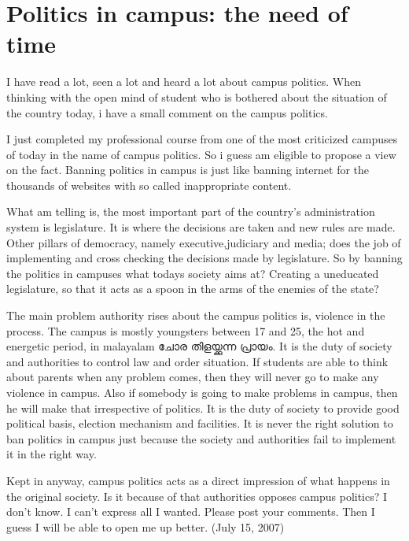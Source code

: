\section*{Politics in campus: the need of time}
\vskip 2pt
I have read a lot, seen a lot and heard a lot about campus politics. 
When thinking with the open mind of student who is bothered about 
the situation of the country today, i have a small comment on the campus politics.

I just completed my professional course from one of the most criticized campuses of 
today in the name of campus politics. So i guess am eligible to propose a view on the fact. 
Banning politics in campus is just like banning internet for the thousands of websites with 
so called inappropriate content.


What am telling is, the most important part of the country’s administration system is legislature. 
It is where the decisions are taken and new rules are made. Other pillars of democracy, 
namely executive,judiciary and media; does the job of implementing and cross checking the decisions 
made by legislature. So by banning the politics in campuses what todays society aims at? Creating a 
uneducated legislature, so that it acts as a spoon in the arms of the enemies of the state?


The main problem authority rises about the campus politics is, violence in the process. The campus
is mostly youngsters between 17 and 25, the hot and energetic period, in malayalam ചോര തിളയ്ക്കുന്ന പ്രായം. 
It is the duty of society and authorities to control law and order situation. If students are able to think about
parents when any problem comes, then they will never go to make any violence in campus. Also if somebody is going 
to make problems in campus, then he will make that irrespective of politics. It is the duty of society to provide good
political basis, election mechanism and facilities. It is never the right solution to ban politics in campus just 
because the society and authorities fail to implement it in the right way. 


Kept in anyway, campus politics acts as a direct impression of what happens in the original society. 
Is it because of that authorities opposes campus politics? I don’t know. I can’t express all I wanted. 
Please post your comments. Then I guess I will be able to open me up better. 
(July 15, 2007)
\newpage
